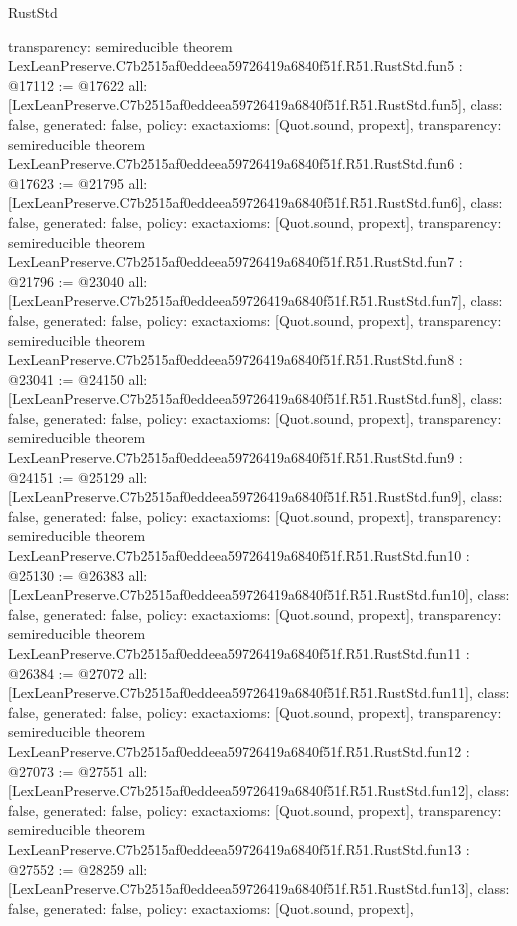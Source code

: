 \begin{lexlean}{RustStd}
\begin{coremodule}
{  transparency: semireducible
}
theorem LexLeanPreserve.C7b2515af0eddeea59726419a6840f51f.R51.RustStd.fun5 : @17112 := @17622 {
  all: [LexLeanPreserve.C7b2515af0eddeea59726419a6840f51f.R51.RustStd.fun5],
  class: false,
  generated: false,
  policy: exact{axioms: [Quot.sound, propext]},
  transparency: semireducible
}
theorem LexLeanPreserve.C7b2515af0eddeea59726419a6840f51f.R51.RustStd.fun6 : @17623 := @21795 {
  all: [LexLeanPreserve.C7b2515af0eddeea59726419a6840f51f.R51.RustStd.fun6],
  class: false,
  generated: false,
  policy: exact{axioms: [Quot.sound, propext]},
  transparency: semireducible
}
theorem LexLeanPreserve.C7b2515af0eddeea59726419a6840f51f.R51.RustStd.fun7 : @21796 := @23040 {
  all: [LexLeanPreserve.C7b2515af0eddeea59726419a6840f51f.R51.RustStd.fun7],
  class: false,
  generated: false,
  policy: exact{axioms: [Quot.sound, propext]},
  transparency: semireducible
}
theorem LexLeanPreserve.C7b2515af0eddeea59726419a6840f51f.R51.RustStd.fun8 : @23041 := @24150 {
  all: [LexLeanPreserve.C7b2515af0eddeea59726419a6840f51f.R51.RustStd.fun8],
  class: false,
  generated: false,
  policy: exact{axioms: [Quot.sound, propext]},
  transparency: semireducible
}
theorem LexLeanPreserve.C7b2515af0eddeea59726419a6840f51f.R51.RustStd.fun9 : @24151 := @25129 {
  all: [LexLeanPreserve.C7b2515af0eddeea59726419a6840f51f.R51.RustStd.fun9],
  class: false,
  generated: false,
  policy: exact{axioms: [Quot.sound, propext]},
  transparency: semireducible
}
theorem LexLeanPreserve.C7b2515af0eddeea59726419a6840f51f.R51.RustStd.fun10 : @25130 := @26383 {
  all: [LexLeanPreserve.C7b2515af0eddeea59726419a6840f51f.R51.RustStd.fun10],
  class: false,
  generated: false,
  policy: exact{axioms: [Quot.sound, propext]},
  transparency: semireducible
}
theorem LexLeanPreserve.C7b2515af0eddeea59726419a6840f51f.R51.RustStd.fun11 : @26384 := @27072 {
  all: [LexLeanPreserve.C7b2515af0eddeea59726419a6840f51f.R51.RustStd.fun11],
  class: false,
  generated: false,
  policy: exact{axioms: [Quot.sound, propext]},
  transparency: semireducible
}
theorem LexLeanPreserve.C7b2515af0eddeea59726419a6840f51f.R51.RustStd.fun12 : @27073 := @27551 {
  all: [LexLeanPreserve.C7b2515af0eddeea59726419a6840f51f.R51.RustStd.fun12],
  class: false,
  generated: false,
  policy: exact{axioms: [Quot.sound, propext]},
  transparency: semireducible
}
theorem LexLeanPreserve.C7b2515af0eddeea59726419a6840f51f.R51.RustStd.fun13 : @27552 := @28259 {
  all: [LexLeanPreserve.C7b2515af0eddeea59726419a6840f51f.R51.RustStd.fun13],
  class: false,
  generated: false,
  policy: exact{axioms: [Quot.sound, propext]},
}
\end{coremodule}
\end{lexlean}
